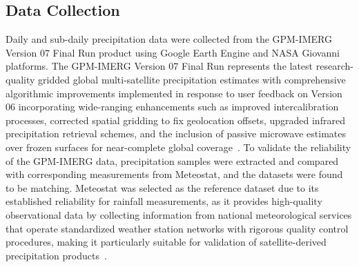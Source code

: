 \subsection{Data Collection}
Daily and sub-daily precipitation data were collected from the GPM-IMERG Version 07 Final Run product using Google Earth Engine and NASA Giovanni platforms.
The GPM-IMERG Version 07 Final Run represents the latest research-quality gridded global multi-satellite precipitation estimates with comprehensive algorithmic improvements implemented in response to user feedback on Version 06 incorporating wide-ranging enhancements such as improved intercalibration processes, corrected spatial gridding to fix geolocation offsets, upgraded infrared precipitation retrieval schemes, and the inclusion of passive microwave estimates over frozen surfaces for near-complete global coverage~\cite{}.
To validate the reliability of the GPM-IMERG data, precipitation samples were extracted and compared with corresponding measurements from Meteostat, and the datasets were found to be matching.
Meteostat was selected as the reference dataset due to its established reliability for rainfall measurements, as it provides high-quality observational data by collecting information from national meteorological services that operate standardized weather station networks with rigorous quality control procedures, making it particularly suitable for validation of satellite-derived precipitation products~\cite{}.
